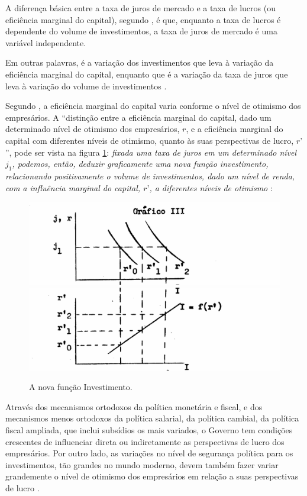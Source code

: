 \documentclass[
	12pt,				%
	oneside,			%
	a4paper,			%
	chapter=TITLE,		%
	section=TITLE,		%
	english,			%
	brazil				%
	]{abntex2}
\begin{document}
A diferença básica entre a taxa de juros de mercado e a taxa de lucros (ou
eficiência marginal do capital), segundo \textcite{Bresser-Pereira1973}, é que, enquanto a
taxa de lucros é dependente do volume de investimentos, a taxa de juros de
mercado é uma variável independente.
\begin{citacao}
Em outras palavras, é a variação dos investimentos que leva à variação da
eficiência marginal do capital, enquanto que é a variação da taxa de juros que
leva à variação do volume de investimentos
\cite{Bresser-Pereira1973}.
\end{citacao}
Segundo \textcite{Bresser-Pereira1973}, a eficiência marginal do capital
varia conforme o nível de otimismo dos empresários. A ``distinção entre a
eficiência marginal do capital, dado um determinado nível de otimismo dos
empresários, \(r\), e a eficiência marginal do capital com diferentes níveis de
otimismo, quanto às suas perspectivas de lucro, \(r’\)'', pode ser vista na
figura \ref{fig:eficienciamarginal2}: \textit{fixada uma taxa de juros em um
determinado nível $j_1$, podemos, então, deduzir graficamente uma nova função
investimento, relacionando positivamente o volume de investimentos, dado um
nível de renda, com a influência marginal do capital, $r’$, a diferentes níveis de
otimismo} \cite[p.~8]{Bresser-Pereira1973}:
\begin{figure}[h]
\begin{center}
\includegraphics[width=.8\textwidth]{images/Page-8-Image-3.png}
\includegraphics[width=.8\textwidth]{images/Page-8-Image-4.png}
\end{center}
\caption{A nova função Investimento.}
\label{fig:eficienciamarginal2}
\end{figure}
\begin{citacao}
Através dos mecanismos ortodoxos da política monetária e fiscal, e dos
mecanismos menos ortodoxos da política salarial, da política cambial, da
política fiscal ampliada, que inclui subsídios os mais variados, o Governo tem
condições crescentes de influenciar direta ou indiretamente as perspectivas de
lucro dos empresários. Por outro lado, as variações no nível de segurança
política para os investimentos, tão grandes no mundo moderno, devem também fazer
variar grandemente o nível de otimismo dos empresários em relação a suas
perspectivas de lucro
\cite[p.~9]{Bresser-Pereira1973}.
\end{citacao}
\end{document}
